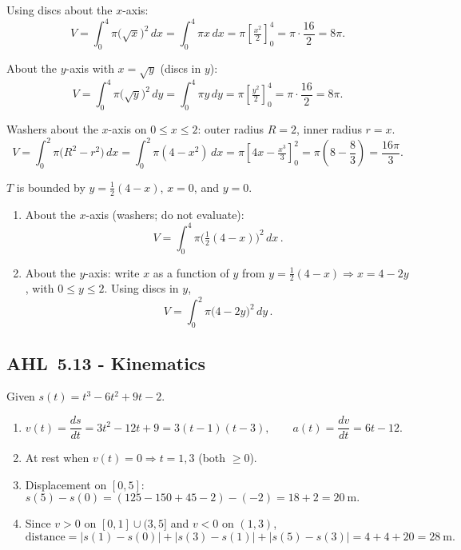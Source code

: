 \documentclass[11pt]{article}
\newcommand{\tocsubsection}[1]{\subsection{#1}}
\begin{document}
\begin{solution}
Using discs about the $x$-axis:
\[
V=\int_{0}^{4}\pi\big(\sqrt{x}\big)^{2}\,dx=\int_{0}^{4}\pi x\,dx
=\pi\left[\tfrac{x^{2}}{2}\right]_{0}^{4}=\pi\cdot\frac{16}{2}=\boxed{8\pi}.
\]
\end{solution}

\begin{solution}
About the $y$-axis with $x=\sqrt{y}$ (discs in $y$):
\[
V=\int_{0}^{4}\pi\big(\sqrt{y}\big)^{2}\,dy=\int_{0}^{4}\pi y\,dy
=\pi\left[\tfrac{y^{2}}{2}\right]_{0}^{4}=\pi\cdot\frac{16}{2}=\boxed{8\pi}.
\]
\end{solution}

\begin{solution}
Washers about the $x$-axis on $0\le x\le 2$:
outer radius $R=2$, inner radius $r=x$.
\[
V=\int_{0}^{2}\pi\big(R^{2}-r^{2}\big)\,dx=\int_{0}^{2}\pi(4-x^{2})\,dx
=\pi\left[4x-\tfrac{x^{3}}{3}\right]_{0}^{2}
=\pi\left(8-\frac{8}{3}\right)=\boxed{\frac{16\pi}{3}}.
\]
\end{solution}

\begin{solution}
$T$ is bounded by $y=\tfrac12(4-x)$, $x=0$, and $y=0$.
\begin{enumerate}
\item About the $x$-axis (washers; do not evaluate):
\[
\boxed{\,V=\displaystyle\int_{0}^{4}\pi\Big(\tfrac12(4-x)\Big)^{2}\,dx\, }.
\]
\item About the $y$-axis: write $x$ as a function of $y$ from $y=\tfrac12(4-x)\Rightarrow x=4-2y$, with $0\le y\le 2$.
Using discs in $y$,
\[
\boxed{\,V=\displaystyle\int_{0}^{2}\pi\big(4-2y\big)^{2}\,dy\, }.
\]
\end{enumerate}
\end{solution}





\tocsubsection{AHL 5.13 - Kinematics}

\begin{solution}
Given \(s(t)=t^{3}-6t^{2}+9t-2\).
\begin{enumerate}
\item \(v(t)=\dfrac{ds}{dt}=3t^{2}-12t+9=3(t-1)(t-3),\qquad 
      a(t)=\dfrac{dv}{dt}=6t-12.\)
\item At rest when \(v(t)=0\Rightarrow t=1,3\) (both \(\ge0\)).
\item Displacement on \([0,5]\): \(s(5)-s(0)=(125-150+45-2)-(-2)=18+2=\boxed{20\ \text{m}}.\)
\item Since \(v>0\) on \([0,1]\cup(3,5]\) and \(v<0\) on \((1,3)\),
\[
\text{distance}=\big|s(1)-s(0)\big|+\big|s(3)-s(1)\big|+\big|s(5)-s(3)\big|
=4+4+20=\boxed{28\ \text{m}}.
\]
\end{enumerate}
\end{solution}
\end{document}
